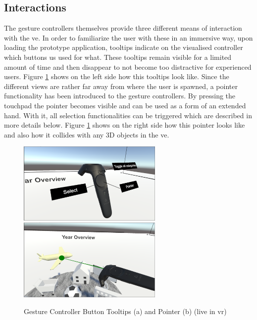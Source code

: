 \subsection{Interactions}

The gesture controllers themselves provide three different means of interaction with the \gls{ve}. In order to familiarize the user with these in an immersive way, upon loading the prototype application, tooltips indicate on the visualised controller which buttons us used for what. These tooltips remain visible for a limited amount of time and then disappear to not become too distractive for experienced users. Figure \ref{fig:unitypointertooltips} shows on the left side how this tooltips look like. \newline
Since the different views are rather far away from where the user is spawned, a pointer functionality has been introduced to the gesture controllers. By pressing the touchpad the pointer becomes visible and can be used as a form of an extended hand. With it, all selection functionalities can be triggered which are described in more details below. Figure \ref{fig:unitypointertooltips} shows on the right side how this pointer looks like and also how it collides with any 3D objects in the \gls{ve}.
\begin{figure}[h]
	\begin{center}
		\includegraphics[width=7cm]{03_Figures/08_Development/Controller_Tooltips.png}
		\includegraphics[width=7cm]{03_Figures/08_Development/Controller_Pointer.png}
		\caption[Gesture Controller Button Tooltips and Pointer (live in \gls{vr})]{Gesture Controller Button Tooltips (a) and Pointer (b) (live in \gls{vr})}
		\label{fig:unitypointertooltips}
	\end{center}
\end{figure}

